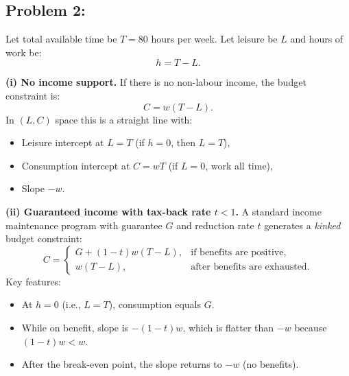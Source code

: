 \documentclass[12pt]{article}
\begin{document}
\subsection*{Problem 2: }

Let total available time be $T=80$ hours per week. Let leisure be $L$ and hours of work be:
\[
h = T - L.
\]

\textbf{(i) No income support.} If there is no non-labour income, the budget constraint is:
\[
C = w(T-L).
\]
In $(L,C)$ space this is a straight line with:
\begin{itemize}
\item Leisure intercept at $L=T$ (if $h=0$, then $L=T$),
\item Consumption intercept at $C=wT$ (if $L=0$, work all time),
\item Slope $-w$.
\end{itemize}

\textbf{(ii) Guaranteed income with tax-back rate $t<1$.}
A standard income maintenance program with guarantee $G$ and reduction rate $t$ generates a \emph{kinked} budget constraint:
\[
C =
\begin{cases}
G + (1-t)w(T-L), & \text{if benefits are positive},\\
w(T-L), & \text{after benefits are exhausted}.
\end{cases}
\]
Key features:
\begin{itemize}
\item At $h=0$ (i.e., $L=T$), consumption equals $G$.
\item While on benefit, slope is $-(1-t)w$, which is flatter than $-w$ because $(1-t)w<w$.
\item After the break-even point, the slope returns to $-w$ (no benefits).
\end{itemize}
\end{document}
